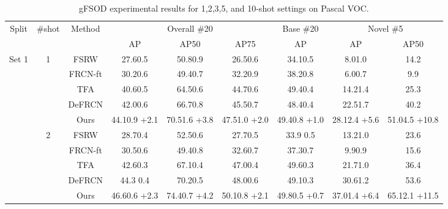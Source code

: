 \documentclass{article}
\begin{document}
\begin{table}[hbt!]
    \caption{gFSOD experimental results for 1,2,3,5, and 10-shot settings on Pascal VOC.}

    \centering
    \begin{adjustbox}{width=0.79\textwidth}
        {
    \begin{tabular}{c|c|c|ccc|c|cc}
        \toprule
         \multirow{2}{*}{Split}&\multirow{2}{*}{\#shot}&\multirow{2}{*}{Method}&\multicolumn{3}{c|}{Overall \#20} & \multicolumn{1}{c|}{Base \#20} & \multicolumn{2}{c}{Novel \#5}  \\
         &&&AP&AP50&AP75&AP&AP&AP50 \\
         \hline
         \multirow{25}{*}{ Set 1}&\multirow{5}{*}{1}&FSRW \cite{metayolo} &27.60.5&50.80.9&26.50.6&34.10.5&8.01.0&14.2  \\
         &&FRCN-ft \cite{metarcnn}&30.20.6&49.40.7&32.20.9&38.20.8&6.00.7&9.9\\
         &&TFA \cite{tfa}&40.60.5&64.50.6&44.70.6&49.40.4&14.21.4&25.3\\
         && DeFRCN \cite{defrcn}&42.00.6&66.70.8&45.50.7&48.40.4&22.51.7&40.2\\
         && \cellcolor{gray!30}Ours&\cellcolor{gray!30}44.10.9 {\scriptsize \color{red}+2.1}&\cellcolor{gray!30}70.51.6 {\scriptsize \color{red}+3.8}&\cellcolor{gray!30}47.51.0 {\scriptsize \color{red}+2.0}&\cellcolor{gray!30} 49.40.8 {\scriptsize \color{red}+1.0}&\cellcolor{gray!30} 28.12.4 {\scriptsize \color{red}+5.6}&\cellcolor{gray!30} 51.04.5 {\scriptsize \color{red}+10.8}\\
         \cmidrule{2-9}
         &\multirow{5}{*}{2}&FSRW \cite{metayolo} & 28.70.4 & 52.50.6& 27.70.5& 33.9 0.5&13.21.0&23.6 \\
         &&FRCN-ft \cite{metarcnn}&30.50.6&49.40.8&32.60.7&37.30.7&9.90.9&15.6\\
         &&TFA \cite{tfa}&42.60.3&67.10.4&47.00.4&49.60.3&21.71.0&36.4\\
         &&DeFRCN \cite{defrcn}&44.3 0.4&70.20.5&48.00.6&49.10.3&30.61.2&53.6\\
         && \cellcolor{gray!30}Ours&\cellcolor{gray!30}46.60.6 {\scriptsize \color{red}+2.3}&\cellcolor{gray!30}74.40.7 {\scriptsize \color{red}+4.2}&\cellcolor{gray!30}50.10.8 {\scriptsize \color{red}+2.1}&\cellcolor{gray!30}49.80.5 {\scriptsize \color{red}+0.7}&\cellcolor{gray!30}37.01.4 {\scriptsize \color{red}+6.4}&\cellcolor{gray!30}65.12.1 {\scriptsize \color{red}+11.5}\\
         \cmidrule{2-9}

\end{tabular}}
\end{adjustbox}
\end{table}
\end{document}
